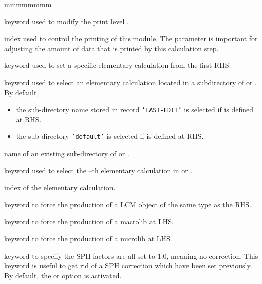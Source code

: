 \begin{ListeDeDescription}{mmmmmmmm}

\item[\moc{EDIT}] keyword used to modify the print level .

\item[\dusa{iprint}] index used to control the printing of this module. The
 parameter is important for adjusting the amount of data that is
printed by this calculation step.

\item[\moc{STEP}] keyword used to set a specific elementary calculation from the first RHS.

\item[\moc{UP}] keyword used to select an elementary calculation located in a subdirectory of  or . By default,
\begin{itemize}
\item the sub-directory name stored in record {\tt 'LAST-EDIT'} is selected if  is defined at RHS.
\item the sub-directory {\tt 'default'} is selected if  is defined at RHS.
\end{itemize}

\item[\dusa{NOMDIR}] name of an existing sub-directory of  or .

\item[\moc{AT}] keyword used to select the --th elementary calculation in  or .

\item[\dusa{index}] index of the elementary calculation.

\item[\moc{IDEM}] keyword to force the production of a LCM object of the same type as the RHS.

\item[\moc{MACRO}] keyword to force the production of a macrolib at LHS.

\item[\moc{MICRO}] keyword to force the production of a microlib at LHS.

\item[\moc{OFF}] keyword to specify the SPH factors are all set to 1.0,
meaning no correction. This keyword is useful to get rid of a SPH correction which have been set previously. By
default, the  or  option is activated.


\end{ListeDeDescription}
